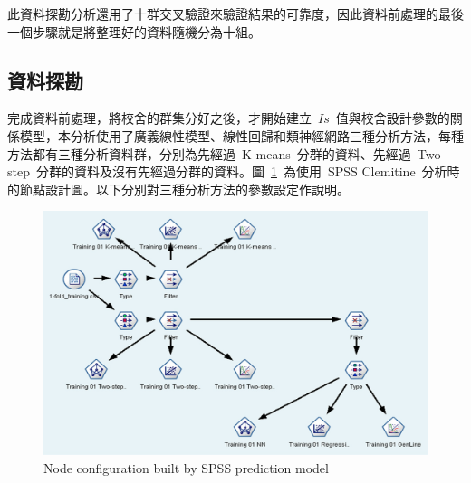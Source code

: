 
此資料探勘分析還用了十群交叉驗證來驗證結果的可靠度，因此資料前處理的最後一個步驟就是將整理好的資料隨機分為十組。


\subsection{資料探勘}

完成資料前處理，將校舍的群集分好之後，才開始建立~$Is$~值與校舍設計參數的關係模型，本分析使用了廣義線性模型、線性回歸和類神經網路三種分析方法，每種方法都有三種分析資料群，分別為先經過~K-means~分群的資料、先經過~Two-step~分群的資料及沒有先經過分群的資料。圖~\ref{fig:spss-mining}~為使用~SPSS Clemitine~分析時的節點設計圖。以下分別對三種分析方法的參數設定作說明。

\begin{figure}[hbtp]
  \begin{center}
    \includegraphics[width=1.0\textwidth]{figures/spss-mining.png}
    \caption{Node configuration built by SPSS prediction model} 
    \label{fig:spss-mining}
  \end{center}
\end{figure}

